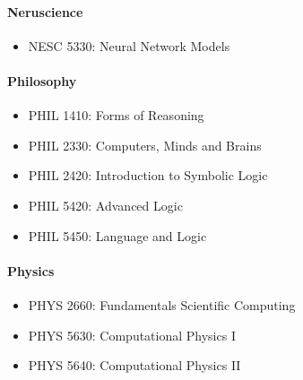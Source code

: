 \documentclass[10pt,letter]{book}
\newenvironment{itemlist}{
\begin{itemize}
\setlength{\itemsep}{0pt}
\setlength{\parskip}{0pt}}
{\end{itemize}}
\begin{document}
\paragraph{Neruscience}
\begin{itemlist}
\item NESC 5330: Neural Network Models
\end{itemlist}

\paragraph{Philosophy}
\begin{itemlist}
\item PHIL 1410: Forms of Reasoning
\item PHIL 2330: Computers, Minds and Brains
\item PHIL 2420: Introduction to Symbolic Logic
\item PHIL 5420: Advanced Logic
\item PHIL 5450: Language and Logic
\end{itemlist}

\paragraph{Physics}
\begin{itemlist}
\item PHYS 2660: Fundamentals Scientific Computing
\item PHYS 5630: Computational Physics I
\item PHYS 5640: Computational Physics II
\end{itemlist}
\end{document}
